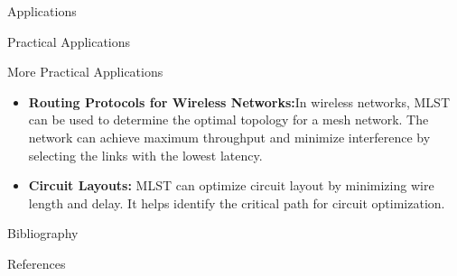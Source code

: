 \documentclass[xcolor=svgnames]{beamer}
\begin{document}
\begin{section}{Applications}
\begin{subsection}{Practical Applications}
    \begin{frame}{More Practical Applications}
        \begin{itemize}
      \item \textbf{Routing Protocols for Wireless Networks:}\newline In wireless networks, MLST can be used to determine the optimal topology for a mesh network. The network can achieve maximum throughput and minimize interference by selecting the links with the lowest latency.\cite{kamei2013self}\cite{guha1998approximation}\cite{schwartges2011approximation}
      \newline
      \item \textbf{Circuit Layouts:}\newline
      MLST can optimize circuit layout by minimizing wire length and delay. It helps identify the critical path for circuit optimization.\cite{storer1981constructing}
    \end{itemize}
    \end{frame}
    \end{subsection}
\end{section}





\begin{section}{Bibliography}
\begin{frame}[allowframebreaks]{References}
  \printbibliography  
\end{frame}
\end{section}
\end{document}
